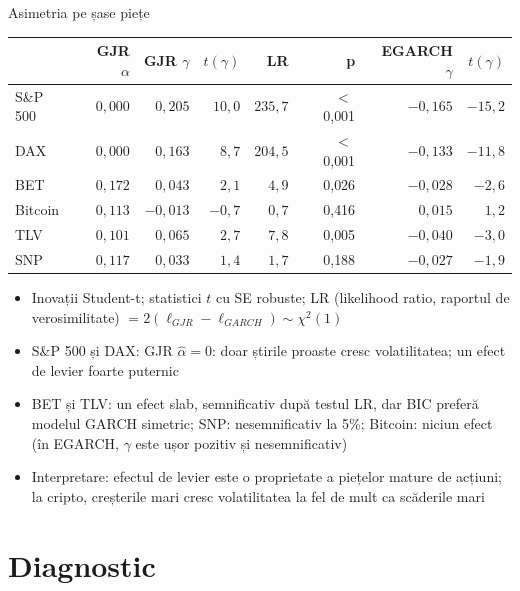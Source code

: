 \begin{frame}{Asimetria pe șase piețe}
\itemsize{\footnotesize}
\begin{center}
\scriptsize
\begin{tabular}{lrrrrrrr}
\toprule
& GJR $\alpha$ & GJR $\gamma$ & $t(\gamma)$ & LR & p & EGARCH $\gamma$ & $t(\gamma)$ \\
\midrule
S\&P 500 & $0{,}000$ & $0{,}205$ & $10{,}0$ & $235{,}7$ & $<$\,0{,}001 & ${-0{,}165}$ & ${-15{,}2}$ \\
DAX & $0{,}000$ & $0{,}163$ & $8{,}7$ & $204{,}5$ & $<$\,0{,}001 & ${-0{,}133}$ & ${-11{,}8}$ \\
BET & $0{,}172$ & $0{,}043$ & $2{,}1$ & $4{,}9$ & 0{,}026 & ${-0{,}028}$ & ${-2{,}6}$ \\
Bitcoin & $0{,}113$ & $-0{,}013$ & $-0{,}7$ & $0{,}7$ & 0{,}416 & ${0{,}015}$ & ${1{,}2}$ \\
TLV & $0{,}101$ & $0{,}065$ & $2{,}7$ & $7{,}8$ & 0{,}005 & ${-0{,}040}$ & ${-3{,}0}$ \\
SNP & $0{,}117$ & $0{,}033$ & $1{,}4$ & $1{,}7$ & 0{,}188 & ${-0{,}027}$ & ${-1{,}9}$ \\
\bottomrule
\end{tabular}
\end{center}
\begin{itemize}
    \item Inovații Student-t; statistici $t$ cu SE robuste; LR (likelihood ratio, raportul de verosimilitate) $= 2(\ell_{GJR} - \ell_{GARCH}) \sim \chi^2(1)$
    \item S\&P 500 și DAX: GJR $\hat\alpha = 0$: doar știrile proaste cresc volatilitatea; un efect de levier foarte puternic
    \item BET și TLV: un efect slab, semnificativ după testul LR, dar BIC preferă modelul GARCH simetric; SNP: nesemnificativ la 5\%; Bitcoin: niciun efect (în EGARCH, $\gamma$ este ușor pozitiv și nesemnificativ)
    \item Interpretare: efectul de levier este o proprietate a piețelor mature de acțiuni; la cripto, creșterile mari cresc volatilitatea la fel de mult ca scăderile mari
\end{itemize}
\end{frame}


\section{Diagnostic}

